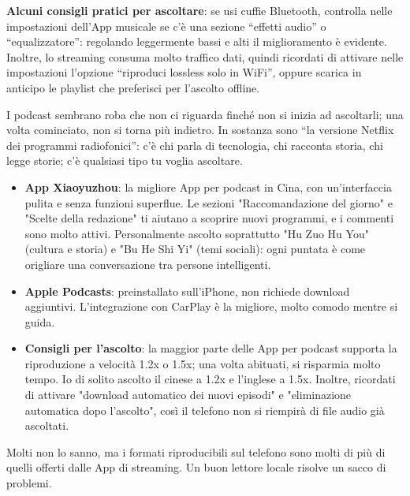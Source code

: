 \textbf{Alcuni consigli pratici per ascoltare}: se usi cuffie Bluetooth, controlla nelle impostazioni dell'App musicale se c'è una sezione “effetti audio” o “equalizzatore”: regolando leggermente bassi e alti il miglioramento è evidente. Inoltre, lo streaming consuma molto traffico dati, quindi ricordati di attivare nelle impostazioni l'opzione “riproduci lossless solo in WiFi”, oppure scarica in anticipo le playlist che preferisci per l'ascolto offline.


I podcast sembrano roba che non ci riguarda finché non si inizia ad ascoltarli; una volta cominciato, non si torna più indietro. In sostanza sono “la versione Netflix dei programmi radiofonici”: c'è chi parla di tecnologia, chi racconta storia, chi legge storie; c'è qualsiasi tipo tu voglia ascoltare.

\begin{itemize}
  \item \textbf{App Xiaoyuzhou}: la migliore App per podcast in Cina, con un'interfaccia pulita e senza funzioni superflue. Le sezioni "Raccomandazione del giorno" e "Scelte della redazione" ti aiutano a scoprire nuovi programmi, e i commenti sono molto attivi. Personalmente ascolto soprattutto "Hu Zuo Hu You" (cultura e storia) e "Bu He Shi Yi" (temi sociali): ogni puntata è come origliare una conversazione tra persone intelligenti.
  \item \textbf{Apple Podcasts}: preinstallato sull'iPhone, non richiede download aggiuntivi. L'integrazione con CarPlay è la migliore, molto comodo mentre si guida.
  \item \textbf{Consigli per l'ascolto}: la maggior parte delle App per podcast supporta la riproduzione a velocità 1.2x o 1.5x; una volta abituati, si risparmia molto tempo. Io di solito ascolto il cinese a 1.2x e l'inglese a 1.5x. Inoltre, ricordati di attivare "download automatico dei nuovi episodi" e "eliminazione automatica dopo l'ascolto", così il telefono non si riempirà di file audio già ascoltati.
\end{itemize}


Molti non lo sanno, ma i formati riproducibili sul telefono sono molti di più di quelli offerti dalle App di streaming. Un buon lettore locale risolve un sacco di problemi.


